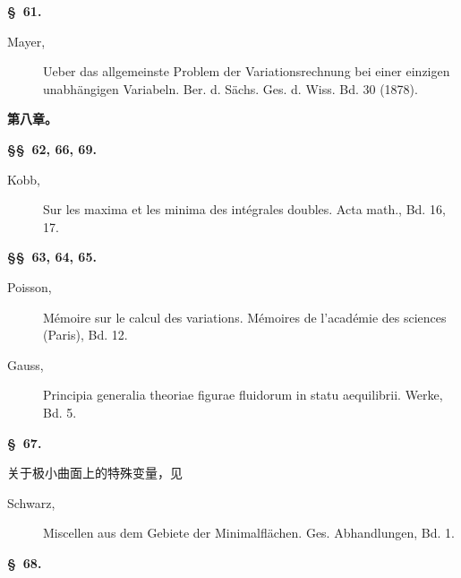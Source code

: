 \documentclass[11pt,a4paper,leqno]{article}
\begin{document}
\begin{center}{\bfseries \S~61.}\end{center}

\begin{description}
\item[Mayer,] Ueber das allgemeinste Problem der Variationsrechnung bei einer
einzigen unabhängigen Variabeln. Ber. d. Sächs. Ges. d. Wiss. Bd. 30 (1878).
\end{description}

\begin{center}
{\large\bfseries 第八章。}

{\bfseries \S\S~62, 66, 69.}
\end{center}

\begin{description}
\item[Kobb,] Sur les maxima et les minima des intégrales doubles. Acta math.,
Bd. 16, 17.
\end{description}

\begin{center}{\bfseries \S\S~63, 64, 65.}\end{center}

\begin{description}
\item[Poisson,] Mémoire sur le calcul des variations. Mémoires de l'académie des
sciences (Paris), Bd. 12.

\item[Gauss,] Principia generalia theoriae figurae fluidorum in statu
aequilibrii. Werke, Bd. 5.
\end{description}

\begin{center}{\bfseries \S~67.}\end{center}

\noindent 关于极小曲面上的特殊变量，见

\begin{description}
\item[Schwarz,] Miscellen aus dem Gebiete der Minimalflächen. Ges.
Abhandlungen, Bd. 1.
\end{description}

\begin{center}{\bfseries \S~68.}\end{center}
\end{document}
